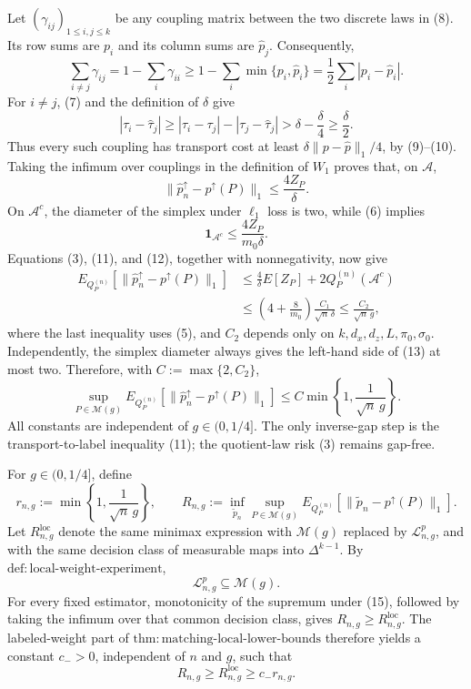 Let \((\gamma_{ij})_{1\le i,j\le k}\) be any coupling matrix between the two discrete laws in (8).  Its row sums are \(p_i\) and its column sums are \(\widehat p_j\).  Consequently,
\[
 \sum_{i\ne j}\gamma_{ij}
 =1-\sum_i\gamma_{ii}
 \ge1-\sum_i\min\{p_i,\widehat p_i\}
 =\frac12\sum_i|p_i-\widehat p_i|.                                         \tag{9}
\]
For \(i\ne j\), (7) and the definition of \(\delta\) give
\[
 |\tau_i-\widehat\tau_j|
 \ge |\tau_i-\tau_j|-|\tau_j-\widehat\tau_j|
 >\delta-\frac\delta4
 \ge\frac\delta2.                                                          \tag{10}
\]
Thus every such coupling has transport cost at least \(\delta\lVert p-\widehat p\rVert_1/4\), by (9)--(10).  Taking the infimum over couplings in the definition of \(W_1\) proves that, on \(\mathcal A\),
\[
 \lVert\widehat p_n^{\uparrow}-p^{\uparrow}(P)\rVert_1
 \le\frac{4Z_P}{\delta}.                                                    \tag{11}
\]
On \(\mathcal A^c\), the diameter of the simplex under \(\ell_1\) loss is two, while (6) implies
\[
 \mathbf1_{\mathcal A^c}\le\frac{4Z_P}{m_0\delta}.                         \tag{12}
\]
Equations (3), (11), and (12), together with nonnegativity, now give
\[
\begin{aligned}
 E_{Q_P^{(n)}}\!\left[
 \lVert\widehat p_n^{\uparrow}-p^{\uparrow}(P)\rVert_1\right]
 &\le \frac4\delta E[Z_P]
      +2Q_P^{(n)}(\mathcal A^c)\\
 &\le\left(4+\frac8{m_0}\right)\frac{C_1}{\sqrt n\,\delta}
 \le\frac{C_2}{\sqrt n\,g},                                               \tag{13}
\end{aligned}
\]
where the last inequality uses (5), and \(C_2\) depends only on \(k,d_x,d_z,L,\pi_0,\sigma_0\).  Independently, the simplex diameter always gives the left-hand side of (13) at most two.  Therefore, with \(C:=\max\{2,C_2\}\),
\[
 \sup_{P\in\mathcal M(g)}E_{Q_P^{(n)}}\!\left[
 \lVert\widehat p_n^{\uparrow}-p^{\uparrow}(P)\rVert_1\right]
 \le C\min\left\{1,\frac1{\sqrt n\,g}\right\}.
\]
All constants are independent of \(g\in(0,1/4]\).  The only inverse-gap step is the transport-to-label inequality (11); the quotient-law risk (3) remains gap-free.

For \(g\in(0,1/4]\), define
\[
 r_{n,g}:=\min\left\{1,\frac1{\sqrt n\,g}\right\},
 \qquad
 R_{n,g}:=\inf_{\widetilde p_n}\sup_{P\in\mathcal M(g)}
 E_{Q_P^{(n)}}\!\left[
 \lVert\widetilde p_n-p^{\uparrow}(P)\rVert_1\right].                       \tag{14}
\]
Let \(R_{n,g}^{\mathrm{loc}}\) denote the same minimax expression with \(\mathcal M(g)\) replaced by \(\mathcal L_{n,g}^{p}\), and with the same decision class of measurable maps into \(\Delta^{k-1}\).  By \(\mathrm{def:local\text{-}weight\text{-}experiment}\),
\[
 \mathcal L_{n,g}^{p}\subseteq\mathcal M(g).                                \tag{15}
\]
For every fixed estimator, monotonicity of the supremum under (15), followed by taking the infimum over that common decision class, gives \(R_{n,g}\ge R_{n,g}^{\mathrm{loc}}\).  The labeled-weight part of \(\mathrm{thm:matching\text{-}local\text{-}lower\text{-}bounds}\) therefore yields a constant \(c_->0\), independent of \(n\) and \(g\), such that
\[
 R_{n,g}\ge R_{n,g}^{\mathrm{loc}}\ge c_-r_{n,g}.                           \tag{16}
\]

